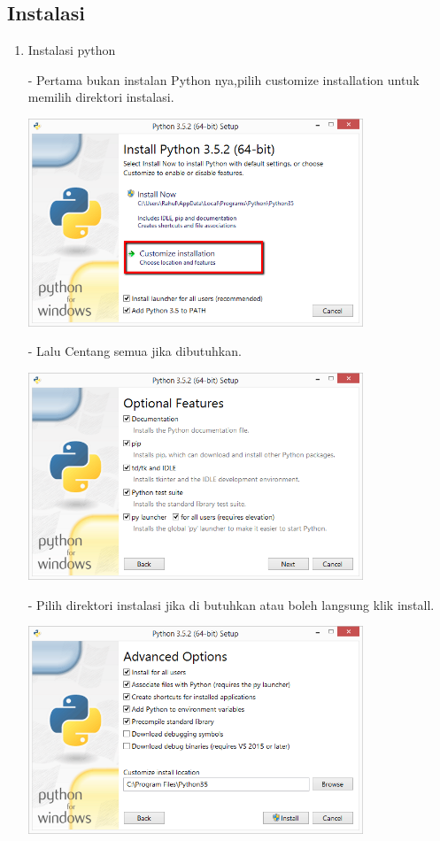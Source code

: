 \subsection{Instalasi}
\begin{enumerate}
    \item Instalasi python
    
   -  Pertama bukan instalan Python nya,pilih customize installation untuk memilih direktori instalasi.
    
    \begin{center}
       \includegraphics[width=10cm]{section/install-python-1.png}
    \ 
    \end{center}
 
- Lalu Centang semua jika dibutuhkan.


    \begin{center}
        
    \includegraphics[width=10cm]{section/install-python-3.png}
    \end{center}
    - Pilih direktori instalasi jika di butuhkan atau boleh langsung klik install.
    
    \begin{center}
        \includegraphics[width=10cm]{section/install-python-4.png}
    \end{center}
    

\end{enumerate}
